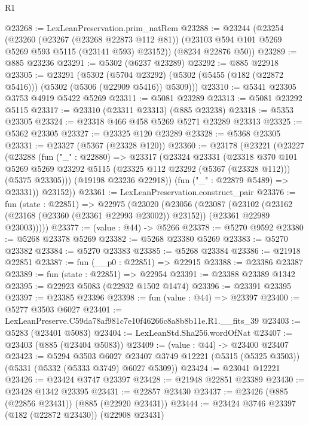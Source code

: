 \begin{lexlean}{R1}
\begin{coremodule}
@23268 := LexLeanPreservation.prim_natRem
@23288 := @23244
    (@23254
      (@23260
        (@23267 (@23268 @22873 @112 @81))
        (@23103 @594 @101 @5269 @5269 @593 @5115 (@23141 @593) @23152))
      (@8234 @22876 @50))
@23289 := @885 @23236
@23291 := @5302 (@6237 @23289)
@23292 := @885 @22918
@23305 := @23291
    (@5302
      (@5704 @23292)
      (@5302 (@5455 (@182 (@22872 @5416))) (@5302 (@5306 (@22909 @5416)) @5309)))
@23310 := @5341 @23305 @3753 @4919 @5422 @5269
@23311 := @5081 @23289
@23313 := @5081 @23292 @5115
@23317 := @23310 (@23311 @23313) (@885 @23238)
@23318 := @5353 @23305
@23324 := @23318 @466 @458 @5269 @5271 @23289 @23313
@23325 := @5362 @23305
@23327 := @23325 @120 @23289
@23328 := @5368 @23305
@23331 := @23327 (@5367 (@23328 @120))
@23360 := @23178
    (@23221
      (@23227
        (@23288
          (fun ("_" : @22880) =>
          @23317
            (@23324
              @23331
              (@23318
                @370
                @101
                @5269
                @5269
                @23292
                @5115
                (@23325 @112 @23292 (@5367 (@23328 @112)))
                (@5375 @23305)))
            (@19198 @23236 @22918))
          (fun ("_" : @22879 @5489) => @23331))
        @23152))
@23361 := LexLeanPreservation.construct_pair
@23376 := fun (state : @22851) =>
  @22975
    (@23020
      (@23056
        (@23087
          (@23102
            (@23162 (@23168 (@23360 (@23361 @22993 @23002)) @23152))
            (@23361 @22989 @23003)))))
@23377 := (value : @44) -> @5266
@23378 := @5270 @9592
@23380 := @5268 @23378 @5269
@23382 := @5268 @23380 @5269
@23383 := @5270 @23382
@23384 := @5270 @23383
@23385 := @5268 @23384
@23386 := @21918 @22851
@23387 := fun (__p0 : @22851) => @22915
@23388 := @23386 @23387
@23389 := fun (state : @22851) => @22954
@23391 := @23388 @23389 @1342
@23395 := @22923 @5083 (@22932 @1502 @1474)
@23396 := @23391 @23395
@23397 := @23385 @23396
@23398 := fun (value : @44) => @23397
@23400 := @5277 @3503 @6027
@23401 := LexLeanPreserve.C59da78af981c7e10f46266c8a8b8b11e.R1.__fits_39
@23403 := @5283 (@23401 @5083)
@23404 := LexLeanStd.Sha256.wordOfNat
@23407 := @23403 (@885 (@23404 @5083))
@23409 := (value : @44) -> @23400 @23407
@23423 := @5294
    @3503
    @6027
    @23407
    @3749
    @12221
    (@5315 (@5325 @3503))
    (@5331 (@5332 (@5333 @3749) @6027 @5309))
@23424 := @23041 @12221
@23426 := @23424 @3747 @23397
@23428 := @21948 @22851 @23389
@23430 := @23428 @1342 @23395
@23431 := @22857 @23430
@23437 := @23426 (@885 (@22856 @23431)) (@885 (@22920 @23431))
@23444 := @23424 @3746 @23397 (@182 (@22872 @23430)) (@22908 @23431)

\end{coremodule}
\end{lexlean}

